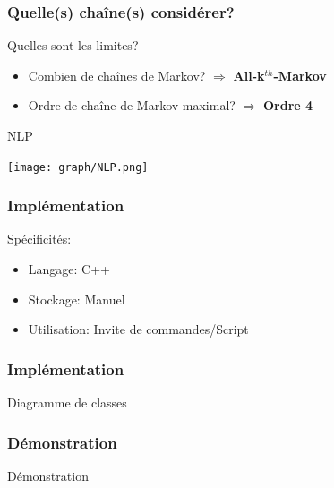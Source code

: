 \documentclass{beamer}
\begin{document}
            \begin{frame}
                \frametitle{Quelle(s) chaîne(s) considérer?}
                Quelles sont les limites?
                \begin{itemize}
                    \pause[2]
                    \item Combien de chaînes de Markov? \pause[3] $\Rightarrow$ \textbf{All-k}$^{th}$\textbf{-Markov}
                    \pause[4]
                    \item Ordre de chaîne de Markov maximal? \pause[6] $\Rightarrow$ \textbf{Ordre 4}
                    \pause[5]
                \end{itemize}
                \begin{exampleblock}{NLP}
                    \begin{center}
                        \texttt{[image: graph/NLP.png]}
                    \end{center}
                \end{exampleblock}
            \end{frame}
            \begin{frame}
                \frametitle{Implémentation}
                Spécificités:
                \begin{itemize}
                    \pause
                    \item Langage: \pause C++
                    \pause
                    \item Stockage: \pause Manuel
                    \pause
                    \item Utilisation: \pause Invite de commandes/Script
                \end{itemize}
            \end{frame}
            \begin{frame}
                \frametitle{Implémentation}
                \begin{block}{Diagramme de classes}
                    \begin{center}
                        \pause[2]
                    \end{center}
                \end{block}
            \end{frame}
            \begin{frame}
                \frametitle{Démonstration}
                \begin{center}
                    Démonstration
                \end{center}
            \end{frame}
\end{document}
